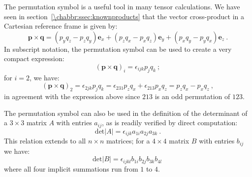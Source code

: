 The permutation symbol is a useful tool in many tensor calculations. We have seen in section~\ref{\chabbr:ssec:knownproducts} that the vector cross-product in a Cartesian reference frame is given by:
\begin{equation}
	\mathbf{p}\times\mathbf{q} = (p_yq_z-p_zq_y) \mathbf{e}_x+(p_zq_x-p_xq_z) \mathbf{e}_y+(p_xq_y- p_yq_x) \mathbf{e}_z\ .
\end{equation}
In subscript notation, the permutation symbol can be used to create a very compact expression:
\[
	(\mathbf{p}\times\mathbf{q})_i = \epsilon_{ijk}p_jq_k\ ;
\]
for $i=2$, we have:
\[
	(\mathbf{p}\times\mathbf{q})_2 = \epsilon_{2jk}p_jq_k= \epsilon_{231}p_zq_x+\epsilon_{213}p_xq_z = p_zq_x-p_xq_z \ ,
\]
in agreement with the expression above since $213$ is an odd permutation of $123$.

The permutation symbol can also be used in the definition of the determinant of a $3\times 3$ matrix $A$ with entries $a_{ij}$, as is readily verified by direct computation:
\[
	\text{det}\vert A\vert = \epsilon_{ijk}a_{1i}a_{2j}a_{3k}\ .
\]
This relation extends to all $n\times n$ matrices; for a $4\times 4$ matrix $B$ with entries $b_{ij}$ we have:
\[
	\text{det}\vert B\vert = \epsilon_{ijkl}b_{1i}b_{2j}b_{3k}b_{4l}\ 
\]
where all four implicit summations run from $1$ to $4$.

